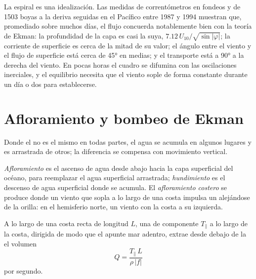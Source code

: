 La espiral es una idealización. Las medidas de correntómetros en fondeos y de 1503 boyas a la deriva seguidas en el Pacífico entre 1987 y 1994 muestran que, promediado sobre muchos días, el flujo concuerda notablemente bien con la teoría de Ekman: la profundidad de la capa es casi la suya, $7.12\,U_{10}/\sqrt{\sin|\varphi|}$; la corriente de superficie es cerca de la mitad de su valor; el ángulo entre el viento y el flujo de superficie está cerca de \ang{45} en  medias; y el transporte está a \ang{90} a la derecha del viento. En pocas horas el cuadro se difumina con las oscilaciones inerciales, y el equilibrio necesita que el viento sople de forma constante durante un día o dos para establecerse.

\section{Afloramiento y bombeo de Ekman}\label{sec:b1:ocean-circulation:upwelling}

Donde el  no es el mismo en todas partes, el agua se acumula en algunos lugares y es arrastrada de otros; la diferencia se compensa con movimiento vertical.

\begin{definition}\label{def:b1:ocean-circulation:upwelling}
\emph{Afloramiento} es el ascenso de agua desde abajo hacia la capa superficial del océano, para reemplazar el agua superficial arrastrada; \emph{hundimiento}%
 es el descenso de agua superficial donde se acumula. El \emph{afloramiento costero} se produce donde un viento que sopla a lo largo de una costa impulsa un  alejándose de la orilla: en el hemisferio norte, un viento con la costa a su izquierda.
\end{definition}

\begin{proposition}\label{prop:b1:ocean-circulation:coastal}
A lo largo de una costa recta de longitud $L$, una  de componente $T_\parallel$ a lo largo de la costa, dirigida de modo que el  apunte mar adentro, extrae desde debajo de la  el volumen
\[
  Q = \frac{T_\parallel\,L}{\rho\,|f|}
\]
por segundo.
\end{proposition}

